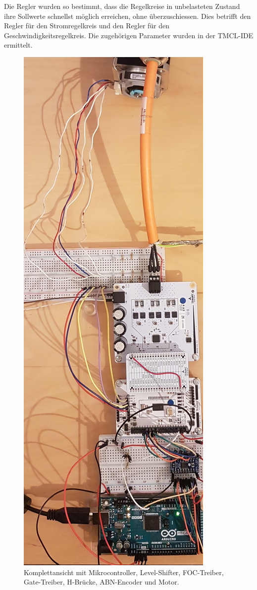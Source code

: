 Die Regler wurden so bestimmt, dass die Regelkreise in unbelasteten Zustand ihre Sollwerte schnellst möglich erreichen, ohne überzuschiessen. Dies betrifft den Regler für den Stromregelkreis und den Regler für den Geschwindigkeitsregelkreis. Die zugehörigen Parameter wurden in der TMCL-IDE ermittelt. 

\begin{figure}[H]
	\centering
	\includegraphics[angle = 270, width=\textwidth]{graphics/4_komplett}
	\caption{Komplettansicht mit Mikrocontroller, Level-Shifter, FOC-Treiber, Gate-Treiber, H-Brücke, ABN-Encoder und Motor.}
	\label{fig:4_komplett}
\end{figure}
